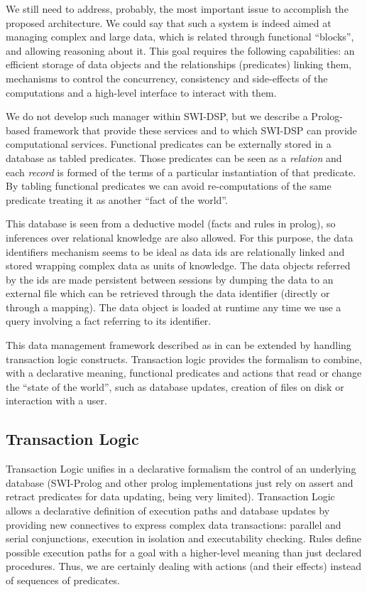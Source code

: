 \documentclass[runningheads]{llncs}
\begin{document}
We still need to address, probably, the most important issue to accomplish the proposed architecture. We could say that such a system is indeed aimed at managing complex and large data, which is related through functional ``blocks'', and allowing reasoning about it. This goal requires the following capabilities: an efficient storage of data objects and the relationships (predicates) linking them, mechanisms to control the concurrency, consistency and side-effects of the computations and a high-level interface to interact with them.

We do not develop such manager within SWI-DSP, but we describe a Prolog-based framework that provide these services and to which SWI-DSP can provide computational services. Functional predicates can be externally stored in a database as tabled predicates. Those predicates can be seen as a \textit{relation} and each \textit{record} is formed of the terms of a particular instantiation of that predicate. By tabling functional predicates we can avoid re-computations of the same predicate treating it as another ``fact of the world''.

This database is seen from a deductive model (facts and rules in prolog), so inferences over relational knowledge are also allowed. For this purpose, the data identifiers mechanism seems to be ideal as data ids are relationally linked and stored wrapping complex data as units of knowledge. The data objects referred by the ids are made persistent between sessions by dumping the data to an external file which can be retrieved through the data identifier (directly or through a mapping). The data object is loaded at runtime any time we use a query involving a fact referring to its identifier.

This data management framework described as in \cite{aes2006} can be extended by handling transaction logic constructs. Transaction logic provides the formalism to combine, with a declarative meaning, functional predicates and actions that read or change the ``state of the world'', such as database updates, creation of files on disk or interaction with a user.

\subsection{Transaction Logic}\label{subsec:ctl}

Transaction Logic \cite{ctl}  unifies in a declarative formalism the control of an underlying database (SWI-Prolog and other prolog implementations just rely on assert and retract predicates for data updating, being very limited). Transaction Logic allows a declarative definition of execution paths and database updates by providing new connectives to express complex data transactions: parallel and serial conjunctions, execution in isolation and executability checking. Rules define possible execution paths for a goal with a higher-level meaning than just declared procedures. Thus, we are certainly dealing with actions (and their effects) instead of sequences of predicates.
\end{document}
